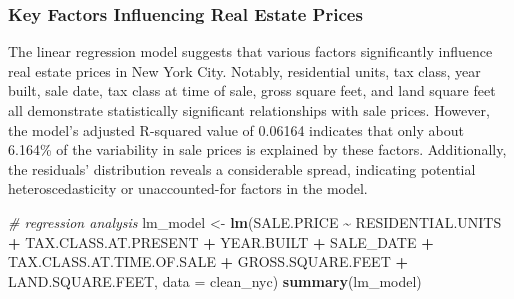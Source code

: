 \documentclass[
]{article}
\newenvironment{Shaded}{\begin{snugshade}}{\end{snugshade}}
\newcommand{\AttributeTok}[1]{\textcolor[rgb]{0.13,0.29,0.53}{#1}}
\newcommand{\CommentTok}[1]{\textcolor[rgb]{0.56,0.35,0.01}{\textit{#1}}}
\newcommand{\FunctionTok}[1]{\textcolor[rgb]{0.13,0.29,0.53}{\textbf{#1}}}
\newcommand{\NormalTok}[1]{#1}
\newcommand{\OtherTok}[1]{\textcolor[rgb]{0.56,0.35,0.01}{#1}}
\newcommand{\SpecialCharTok}[1]{\textcolor[rgb]{0.81,0.36,0.00}{\textbf{#1}}}
\begin{document}
\hypertarget{key-factors-influencing-real-estate-prices}{%
\subsubsection{Key Factors Influencing Real Estate
Prices}\label{key-factors-influencing-real-estate-prices}}

The linear regression model suggests that various factors significantly
influence real estate prices in New York City. Notably, residential
units, tax class, year built, sale date, tax class at time of sale,
gross square feet, and land square feet all demonstrate statistically
significant relationships with sale prices. However, the model's
adjusted R-squared value of 0.06164 indicates that only about 6.164\% of
the variability in sale prices is explained by these factors.
Additionally, the residuals' distribution reveals a considerable spread,
indicating potential heteroscedasticity or unaccounted-for factors in
the model.

\begin{Shaded}
\begin{Highlighting}[]
\CommentTok{\# regression analysis}
\NormalTok{lm\_model }\OtherTok{\textless{}{-}} \FunctionTok{lm}\NormalTok{(SALE.PRICE }\SpecialCharTok{\textasciitilde{}}\NormalTok{ RESIDENTIAL.UNITS }\SpecialCharTok{+}\NormalTok{ TAX.CLASS.AT.PRESENT }\SpecialCharTok{+}\NormalTok{ YEAR.BUILT }\SpecialCharTok{+}\NormalTok{ SALE\_DATE }\SpecialCharTok{+}\NormalTok{ TAX.CLASS.AT.TIME.OF.SALE }\SpecialCharTok{+}\NormalTok{ GROSS.SQUARE.FEET }\SpecialCharTok{+}\NormalTok{ LAND.SQUARE.FEET, }\AttributeTok{data =}\NormalTok{ clean\_nyc)}
\FunctionTok{summary}\NormalTok{(lm\_model)}
\end{Highlighting}
\end{Shaded}
\end{document}
